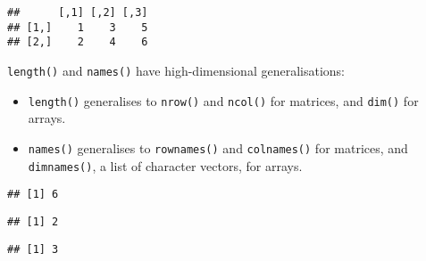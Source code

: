 \begin{verbatim}
##      [,1] [,2] [,3]
## [1,]    1    3    5
## [2,]    2    4    6
\end{verbatim}

\texttt{length()} and \texttt{names()} have high-dimensional
generalisations:

\begin{itemize}
\item
  \texttt{length()} generalises to \texttt{nrow()} and \texttt{ncol()}
  for matrices, and \texttt{dim()} for arrays. 
   
\item
  \texttt{names()} generalises to \texttt{rownames()} and
  \texttt{colnames()} for matrices, and \texttt{dimnames()}, a list of
  character vectors, for arrays.  
\end{itemize}

\begin{Shaded}
\begin{Highlighting}[]
\end{Highlighting}
\end{Shaded}

\begin{verbatim}
## [1] 6
\end{verbatim}

\begin{Shaded}
\begin{Highlighting}[]
\end{Highlighting}
\end{Shaded}

\begin{verbatim}
## [1] 2
\end{verbatim}

\begin{Shaded}
\begin{Highlighting}[]
\end{Highlighting}
\end{Shaded}

\begin{verbatim}
## [1] 3
\end{verbatim}

\begin{Shaded}
\begin{Highlighting}[]
\StringTok{ }\NormalTok{(}\NormalTok{, }\NormalTok{)}
\StringTok{ }\NormalTok{(}\NormalTok{, }\NormalTok{, }\NormalTok{)}
\end{Highlighting}
\end{Shaded}

